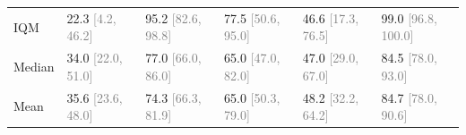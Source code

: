 \begin{tabular}{llllll}
IQM & 22.3 \textcolor{gray}{[4.2, 46.2]} & 95.2 \textcolor{gray}{[82.6, 98.8]} & 77.5 \textcolor{gray}{[50.6, 95.0]} & 46.6 \textcolor{gray}{[17.3, 76.5]} & 99.0 \textcolor{gray}{[96.8, 100.0]} \\
Median & 34.0 \textcolor{gray}{[22.0, 51.0]} & 77.0 \textcolor{gray}{[66.0, 86.0]} & 65.0 \textcolor{gray}{[47.0, 82.0]} & 47.0 \textcolor{gray}{[29.0, 67.0]} & 84.5 \textcolor{gray}{[78.0, 93.0]} \\
Mean & 35.6 \textcolor{gray}{[23.6, 48.0]} & 74.3 \textcolor{gray}{[66.3, 81.9]} & 65.0 \textcolor{gray}{[50.3, 79.0]} & 48.2 \textcolor{gray}{[32.2, 64.2]} & 84.7 \textcolor{gray}{[78.0, 90.6]} \\
\bottomrule
\end{tabular}
